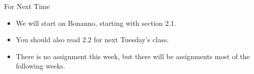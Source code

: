 \documentclass[
  ignorenonframetext,
]{beamer}
\providecommand{\tightlist}{%
  \setlength{\itemsep}{0pt}\setlength{\parskip}{0pt}}
\begin{document}
\begin{frame}{For Next Time}
\protect\hypertarget{for-next-time}{}
\begin{itemize}
\tightlist
\item
  We will start on Bonanno, starting with section 2.1.
\item
  You should also read 2.2 for next Tuesday's class.
\item
  There is no assignment this week, but there will be assignments most
  of the following weeks.
\end{itemize}
\end{frame}
\end{document}
